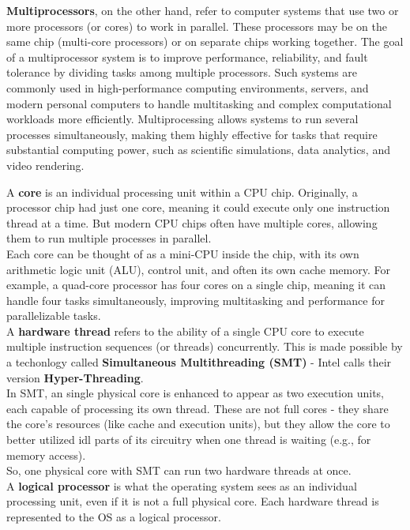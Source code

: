 \documentclass{article}
\begin{document}
\textbf{Multiprocessors}, on the other hand, refer to computer systems that use two or more processors (or cores) to work in parallel. These processors may be on the same chip (multi-core processors) or on separate chips working together. The goal of a multiprocessor system is to improve performance, reliability, and fault tolerance by dividing tasks among multiple processors. Such systems are commonly used in high-performance computing environments, servers, and modern personal computers to handle multitasking and complex computational workloads more efficiently. Multiprocessing allows systems to run several processes simultaneously, making them highly effective for tasks that require substantial computing power, such as scientific simulations, data analytics, and video rendering.


A \textbf{core} is an individual processing unit within a CPU chip. Originally, a processor chip had just one core, meaning it could execute only one instruction thread at a time. But modern CPU chips often have multiple cores, allowing them to run multiple processes in parallel.\\

Each core can be thought of as a mini-CPU inside the chip, with its own arithmetic logic unit (ALU), control unit, and often its own cache memory. For example, a quad-core processor has four cores on a single chip, meaning it can handle four tasks simultaneously, improving multitasking and performance for parallelizable tasks.\\

A \textbf{hardware thread} refers to the ability of a single CPU core to execute multiple instruction sequences (or threads) concurrently. This is made possible by a techonlogy called \textbf{Simultaneous Multithreading (SMT)} - Intel calls their version \textbf{Hyper-Threading}.\\

In SMT, an single physical core is enhanced to appear as two execution units, each capable of processing its own thread. These are not full cores - they share the core's resources (like cache and execution units), but they allow the core to better utilized idl parts of its circuitry when one thread is waiting (e.g., for memory access).\\

So, one physical core with SMT can run two hardware threads at once.\\

A \textbf{logical processor} is what the operating system sees as an individual processing unit, even if it is not a full physical core. Each hardware thread is represented to the OS as a logical processor.
\end{document}
